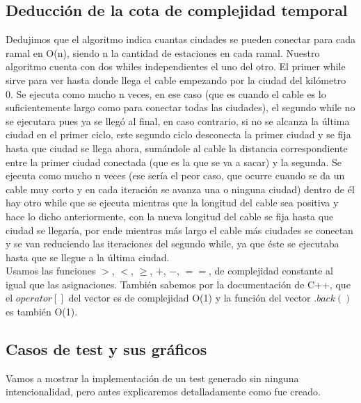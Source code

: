 \subsection{Deducción de la cota de complejidad temporal}

Dedujimos que el algoritmo indica cuantas ciudades se pueden conectar para cada ramal en O(n), siendo n la cantidad de estaciones en cada ramal. Nuestro algoritmo cuenta con dos whiles independientes el uno del otro. El primer while sirve para ver hasta donde llega el cable empezando por la ciudad del kilómetro 0. Se ejecuta como mucho n veces, en ese caso (que es cuando el cable es lo suficientemente largo como para conectar todas las ciudades), el segundo while no se ejecutara pues ya se llegó al final, en caso contrario, si no se alcanza la última ciudad en el primer ciclo, este segundo ciclo desconecta la primer ciudad y se fija hasta que ciudad se llega ahora, sumándole al cable la distancia correspondiente entre la primer ciudad conectada (que es la que se va a sacar) y la segunda. Se ejecuta como mucho n veces (ese sería el peor caso, que ocurre cuando se da un cable muy corto y en cada iteración se avanza una o ninguna ciudad) dentro de él hay otro while que se ejecuta mientras que la longitud del cable sea positiva y hace lo dicho anteriormente, con la nueva longitud del cable se fija hasta que ciudad se llegaría, por ende mientras más largo el cable más ciudades se conectan y se van reduciendo las iteraciones del segundo while, ya que éste se ejecutaba hasta que se llegue a la última ciudad.\\

Usamos las funciones $>$, $<$, $\geq$, $+$, $-$, $==$, de complejidad constante al igual que las asignaciones. También sabemos por la documentación de C++, que el $operator[]$ del vector es de complejidad O(1) y la función del vector $.back()$ es también O(1).\\

\subsection{Casos de test y sus gráficos}

Vamos a mostrar la implementación de un test generado sin ninguna intencionalidad, pero antes explicaremos detalladamente como fue creado. \\

